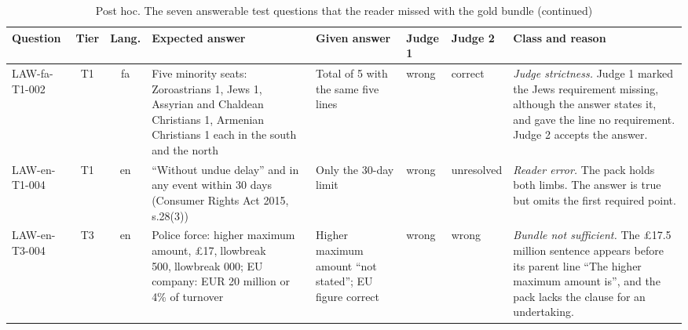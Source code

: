 \begin{table}[tp]
\addtocounter{table}{-1}\renewcommand{\theHtable}{\thetable.cont}
\caption{Post hoc. The seven answerable test questions that the reader missed with the gold bundle (continued)}

\centering
\scriptsize
\setlength{\tabcolsep}{2.5pt}
\begin{tabularx}{\textwidth}{@{}>{\raggedright\arraybackslash}p{2.2cm}cc>{\raggedright\arraybackslash}X>{\raggedright\arraybackslash}X>{\raggedright\arraybackslash}p{1.15cm}>{\raggedright\arraybackslash}p{1.15cm}>{\raggedright\arraybackslash}p{4.6cm}@{}}
\toprule
Question & Tier & Lang. & Expected answer & Given answer & Judge 1 & Judge 2 & Class and reason \\
\midrule
LAW-fa-T1-002 & T1 & fa & Five minority seats: Zoroastrians 1, Jews 1, Assyrian and Chaldean Christians 1, Armenian Christians 1 each in the south and the north & Total of 5 with the same five lines & wrong & correct & \emph{Judge strictness.} Judge 1 marked the Jews requirement missing, although the answer states it, and gave the line no requirement. Judge 2 accepts the answer. \\
LAW-en-T1-004 & T1 & en & ``Without undue delay'' and in any event within 30 days (Consumer Rights Act 2015, s.28(3)) & Only the 30-day limit & wrong & unresolved & \emph{Reader error.} The pack holds both limbs. The answer is true but omits the first required point. \\
LAW-en-T3-004 & T3 & en & Police force: higher maximum amount, \pounds 17,llowbreak 500,llowbreak 000; EU company: EUR 20 million or 4\% of turnover & Higher maximum amount ``not stated''; EU figure correct & wrong & wrong & \emph{Bundle not sufficient.} The \pounds 17.5 million sentence appears before its parent line ``The higher maximum amount is'', and the pack lacks the clause for an undertaking. \\
\bottomrule
\end{tabularx}
\end{table}
